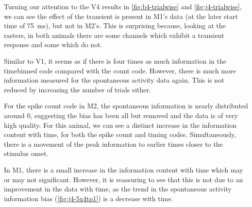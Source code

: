 \begin{figure}[htbp]
{%
}
    \label{fig:j4-trialwise}
\end{figure}



Turning our attention to the \ac{V4} results in \autoref{fig:b4-trialwise} and \autoref{fig:j4-trialwise}, we can see the effect of the transient is present in \ac{M1}'s data (at the later start time of \SI{75}{ms}), but not in \ac{M2}'s.
This is surprising because, looking at the rasters, in both animals there are some channels which exhibit a transient response and some which do not.

Similar to \ac{V1}, it seems as if there is four times as much information in the timebinned code compared with the count code.
However, there is much more information measured for the spontaneous activity data again.
This is not reduced by increasing the number of trials either.

For the spike count code in \ac{M2}, the spontaneous information is nearly distributed around 0, suggesting the bias has been all but removed and the data is of very high quality.
For this animal, we can see a distinct increase in the information content with time, for both the spike count and timing codes.
Simultaneously, there is a movement of the peak information to earlier times closer to the stimulus onset.

In \ac{M1}, there is a small increase in the information content with time which may or may not significant.
However, it is reassuring to see that this is not due to an improvement in the data with time, as the trend in the spontaneous activity information bias (\autoref{fig:j4-5x4tp1}) is a decrease with time.


